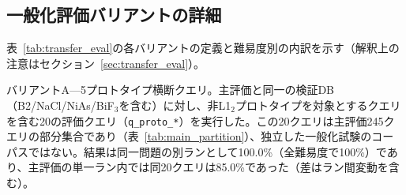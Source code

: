\documentclass[twocolumn]{interact}
\makeatletter
\def\toprule{\noalign{\ifnum0=`}\fi
  \@aboverulesep=\abovetopsep
  \global\@belowrulesep=\belowrulesep
  \global\@thisruleclass=\@ne
  \@ifnextchar[{\@BTrule}{\@BTrule[\heavyrulewidth]}}
\def\midrule{\noalign{\ifnum0=`}\fi
  \@aboverulesep=\aboverulesep
  \global\@belowrulesep=\belowrulesep
  \global\@thisruleclass=\@ne
  \@ifnextchar[{\@BTrule}{\@BTrule[\lightrulewidth]}}
\def\bottomrule{\noalign{\ifnum0=`}\fi
  \@aboverulesep=\aboverulesep
  \global\@belowrulesep=\belowbottomsep
  \global\@thisruleclass=\@ne
  \@ifnextchar[{\@BTrule}{\@BTrule[\heavyrulewidth]}}
\makeatother
\begin{document}
\begin{table}[htbp]
\centering
\caption{CTEマルチステップ計算クエリの精度。上段はfull条件の15クエリ（既知5＋新規10）、下段は既知5パターンに対するアブレーション条件別精度（5ラン平均）である。few-shot例でカバーされた既知5パターンは100\%を維持する一方、例のない新規10パターンは59.0\%にとどまり、マルチステップ計算サポートの範囲がfew-shot例のパターンカバレッジに規定されることを示す。}
\label{tab:cte_results}
\footnotesize
{}\hspace{2em}
\end{table}


\subsection{一般化評価バリアントの詳細}

表~\ref{tab:transfer_eval}の各バリアントの定義と難易度別の内訳を示す（解釈上の注意はセクション~\ref{sec:transfer_eval}）。

バリアントA---5プロトタイプ横断クエリ。主評価と同一の検証DB（B2/NaCl/NiAs/BiF$_3$を含む）に対し、非L1$_2$プロトタイプを対象とするクエリを含む20の評価クエリ（\texttt{q\_proto\_*}）を実行した。この20クエリは主評価245クエリの部分集合であり（表~\ref{tab:main_partition}）、独立した一般化試験のコーパスではない。結果は同一問題の別ランとして100.0\%（全難易度で100\%）であり、主評価の単一ラン内では同20クエリは85.0\%であった（差はラン間変動を含む）。
\end{document}
